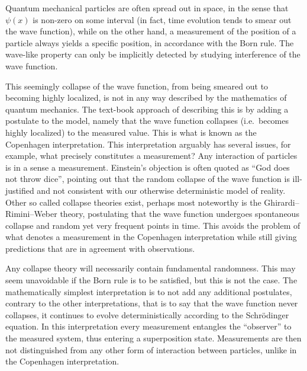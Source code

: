Quantum mechanical particles are often spread out in space, in the sense that $\psi(x)$ is non-zero on some interval (in fact, time evolution tends to smear out the wave function), while on the other hand, a measurement of the position of a particle always yields a specific position, in accordance with the Born rule. The wave-like property can only be implicitly detected by studying interference of the wave function.

This seemingly collapse of the wave function, from being smeared out to becoming highly localized, is not in any way described by the mathematics of quantum mechanics. The text-book approach of describing this is by adding a postulate to the model, namely that the wave function collapses (i.e.\ becomes highly localized) to the measured value. This is what is known as the Copenhagen interpretation. This interpretation arguably has several issues, for example, what precisely constitutes a measurement? Any interaction of particles is in a sense a measurement. Einstein's objection is often quoted as ``God does not throw dice'', pointing out that the random collapse of the wave function is ill-justified and not consistent with our otherwise deterministic model of reality. Other so called collapse theories exist, perhaps most noteworthy is the Ghirardi--Rimini--Weber theory, postulating that the wave function undergoes spontaneous collapse and random yet very frequent points in time. This avoids the problem of what denotes a measurement in the Copenhagen interpretation while still giving predictions that are in agreement with observations.

Any collapse theory will necessarily contain fundamental randomness. This may seem unavoidable if the Born rule is to be satisfied, but this is not the case. The mathematically simplest interpretation is to not add any additional postulates, contrary to the other interpretations, that is to say that the wave function never collapses, it continues to evolve deterministically according to the Schrödinger equation. In this interpretation every measurement entangles the ``observer'' to the measured system, thus entering a superposition state. Measurements are then not distinguished from any other form of interaction between particles, unlike in the Copenhagen interpretation.

